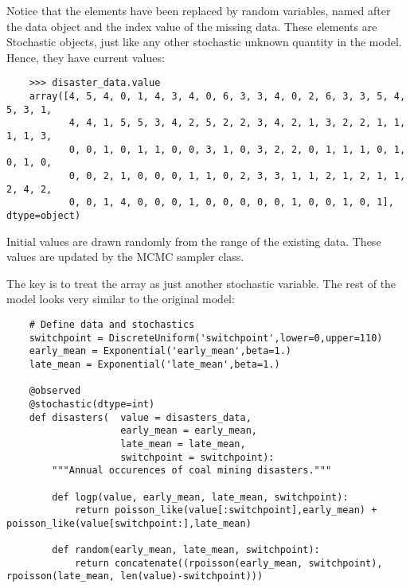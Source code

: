 Notice that the  elements have been replaced by random variables, named after the data object and the index value of the missing data. These elements are Stochastic objects, just like any other stochastic unknown quantity in the model. Hence, they have current values:

\begin{verbatim}
	>>> disaster_data.value
	array([4, 5, 4, 0, 1, 4, 3, 4, 0, 6, 3, 3, 4, 0, 2, 6, 3, 3, 5, 4, 5, 3, 1,
	       4, 4, 1, 5, 5, 3, 4, 2, 5, 2, 2, 3, 4, 2, 1, 3, 2, 2, 1, 1, 1, 1, 3,
	       0, 0, 1, 0, 1, 1, 0, 0, 3, 1, 0, 3, 2, 2, 0, 1, 1, 1, 0, 1, 0, 1, 0,
	       0, 0, 2, 1, 0, 0, 0, 1, 1, 0, 2, 3, 3, 1, 1, 2, 1, 2, 1, 1, 2, 4, 2,
	       0, 0, 1, 4, 0, 0, 0, 1, 0, 0, 0, 0, 0, 1, 0, 0, 1, 0, 1], dtype=object)
\end{verbatim}

Initial values are drawn randomly from the range of the existing data. These values are updated by the MCMC sampler class. 

The key is to treat the  array as just another stochastic variable. The rest of the model looks very similar to the original model:

\begin{verbatim}
	# Define data and stochastics
	switchpoint = DiscreteUniform('switchpoint',lower=0,upper=110)
	early_mean = Exponential('early_mean',beta=1.)
	late_mean = Exponential('late_mean',beta=1.)

	@observed
	@stochastic(dtype=int)
	def disasters(  value = disasters_data, 
	                early_mean = early_mean, 
	                late_mean = late_mean, 
	                switchpoint = switchpoint):
	    """Annual occurences of coal mining disasters."""

	    def logp(value, early_mean, late_mean, switchpoint):
	        return poisson_like(value[:switchpoint],early_mean) + poisson_like(value[switchpoint:],late_mean)

	    def random(early_mean, late_mean, switchpoint):
	        return concatenate((rpoisson(early_mean, switchpoint), rpoisson(late_mean, len(value)-switchpoint)))	
\end{verbatim}

